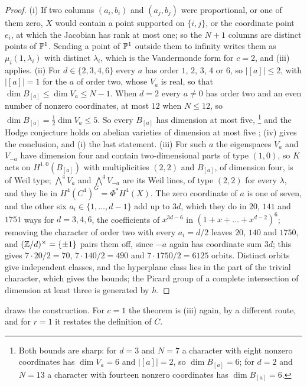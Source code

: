 \begin{proof}
(i) If two columns $(a_{i},b_{i})$ and $(a_{j},b_{j})$ were proportional,
or one of them zero, $X$ would contain a point supported on $\{i,j\}$, or
the coordinate point $e_{i}$, at which the Jacobian has rank at most one;
so the $N+1$ columns are distinct points of $\mathbb{P}^{1}$. Sending a point of
$\mathbb{P}^{1}$ outside them to infinity writes them as
$\mu_{i}(1,\lambda_{i})$ with distinct $\lambda_{i}$, which is the
Vandermonde form for $c=2$, and (iii) applies.
(ii) For $d\in\{2,3,4,6\}$ every $a$ has order $1$, $2$, $3$, $4$ or $6$, so
$|[a]|\le2$, with $|[a]|=1$ for the $a$ of order two, whose $V_{a}$ is real,
so that $\dim B_{[a]}\le\dim V_{a}\le N-1$. When $d=2$ every $a\ne0$ has
order two and an even number of nonzero coordinates, at most $12$ when
$N\le12$, so $\dim B_{[a]}=\tfrac12\dim V_{a}\le5$. So every $B_{[a]}$ has
dimension at most five,%
\footnote{Both bounds are sharp: for $d=3$ and $N=7$ a character with eight
nonzero coordinates has $\dim V_{a}=6$ and $|[a]|=2$, so $\dim B_{[a]}=6$;
for $d=2$ and $N=13$ a character with fourteen nonzero coordinates has
$\dim B_{[a]}=6$.} and the Hodge
conjecture holds on abelian varieties of dimension at most five
\cite{Mar25a,Mar25b,MZ99}; (iv) gives the conclusion,
and (i) the last statement.
(iii) For such $a$ the eigenspaces $V_{a}$ and $V_{-a}$ have dimension four
and contain two-dimensional parts of type $(1,0)$, so $K$ acts on
$H^{1,0}(B_{[a]})$ with multiplicities $(2,2)$ and $B_{[a]}$, of dimension
four, is of Weil type; $\bigwedge^{4}V_{a}$ and $\bigwedge^{4}V_{-a}$ are its
Weil lines, of type $(2,2)$ for every $\lambda$, and they lie in
$H^{4}(C^{4})^{G}=\Phi^{*}H^{4}(X)$. The zero coordinate of $a$ is one of
seven, and the other six $a_{i}\in\{1,\dots,d-1\}$ add up to $3d$, which
they do in $20$, $141$ and $1751$ ways for $d=3,4,6$, the coefficients of
$x^{3d-6}$ in $(1+x+\dots+x^{d-2})^{6}$; removing the character of order two
with every $a_{i}=d/2$ leaves $20$, $140$ and $1750$, and $(\mathbb{Z}/d)^{\times}=
\{\pm1\}$ pairs them off, since $-a$ again has coordinate sum $3d$; this
gives $7\cdot20/2=70$, $7\cdot140/2=490$ and $7\cdot1750/2=6125$ orbits.
Distinct orbits give independent classes, and the hyperplane class
lies in the part of the trivial character, which gives the bounds; the
Picard group of a complete intersection of dimension at least three is
generated by $h$.
\end{proof}

 draws the construction. For $c=1$ the theorem is (iii) again,
by a different route, and for $r=1$ it restates the definition of $C$.

